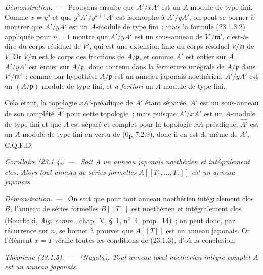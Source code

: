 \documentclass[10pt,oneside]{book}
\makeatletter
\newcommand{\setmanualcurrentlabel}[1]{\def\@currentlabel{#1}}
\newenvironment{theorem}[1][]{%
  \setmanualcurrentlabel{#1}\par\medskip\noindent\itshape Théorème (#1). ---\ }{\par}
\newenvironment{corollary}[1][]{%
  \setmanualcurrentlabel{#1}\par\medskip\noindent\itshape Corollaire (#1). ---\ }{\par}
\newenvironment{proof}{%
  \par\medskip\noindent\textit{Démonstration. ---\ }}{\par}
\makeatother
\begin{document}
\begin{proof}
Prouvons ensuite que $A'/xA'$ est un $A$-module de type fini. Comme $x=y^q$
et que $y^kA'/y^{k+1}A'$ est isomorphe à $A'/yA'$, on peut se borner à
montrer que $A'/yA'$ est un $A$-module de type fini~; mais la formule
(23.1.3.2) appliquée pour $n=1$ montre que $A'/yA'$ est un sous-anneau de
$V'/\mathfrak m'$, c'est-à-dire du corps résiduel de $V'$, qui est une
extension finie du corps résiduel $V/\mathfrak m$ de $V$. Or
$V/\mathfrak m$ est le corps des fractions de $A/\mathfrak p$, et comme
$A'$ est entier sur $A$, $A'/yA'$ est entier sur $A/\mathfrak p$, donc
contenu dans la fermeture intégrale de $A/\mathfrak p$ dans
$V'/\mathfrak m'$~; comme par hypothèse $A/\mathfrak p$ est un anneau
japonais noethérien, $A'/yA'$ est un $(A/\mathfrak p)$-module de type fini,
et \emph{a fortiori} un $A$-module de type fini.

Cela étant, la topologie $xA'$-préadique de $A'$ étant séparée, $A'$ est un
sous-anneau de son complété $\widehat{A'}$ pour cette topologie~; mais puisque
$A'/xA'$ est un $A$-module de type fini et que $A$ est séparé et complet pour
la topologie $xA$-préadique, $\widehat{A'}$ est un $A$-module de type fini en
vertu de (0\textsubscript{I}, 7.2.9), donc il en est de même de $A'$, C.Q.F.D.
\end{proof}

\begin{corollary}[23.1.4]
\label{0.23.1.4-fr}
Soit $A$ un anneau japonais noethérien et intégralement clos. Alors tout
anneau de séries formelles $A[[T_1,\ldots,T_r]]$ est un anneau japonais.
\end{corollary}

\begin{proof}
On sait que pour tout anneau noethérien intégralement clos $B$, l'anneau de
séries formelles $B[[T]]$ est noethérien et intégralement clos (Bourbaki,
\emph{Alg. comm.}, chap.~V, §~1, n\textsuperscript{o}~4, prop.~14)~; on peut
donc, par récurrence sur $n$, se borner à prouver que $A[[T]]$ est un anneau
japonais. Or l'élément $x=T$ vérifie toutes les conditions de (23.1.3), d'où
la conclusion.
\end{proof}

\begin{theorem}[23.1.5]
\label{0.23.1.5-fr}
\textnormal{(Nagata).} Tout anneau local noethérien intègre complet $A$ est
un anneau japonais.
\end{theorem}
\end{document}
